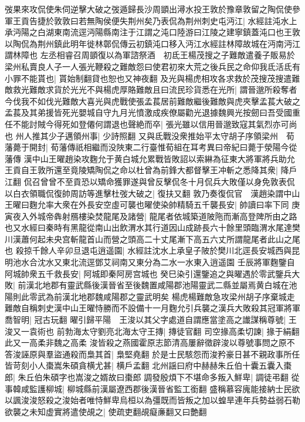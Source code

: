弢果來攻侃使朱伺逆擊大破之弢遁歸長沙周顗出潯水投王敦於豫章敦留之陶侃使參軍王貢告捷於敦敦曰若無陶侯便失荆州矣乃表侃為荆州刺史屯沔江|{
	水經註沌水上承沔陽之白湖東南流逕沔陽縣南注于江謂之沌口陸游曰江陵之建寧鎮蓋沌口也王敦以陶侃為荆州鎮此明年徙林鄣侃傳云初鎮沌口移入沔江水經註林障故城在沔南沔江謂林障也}
左丞相睿召周顗復以為軍諮祭酒　初氐王楊茂搜之子難敵遣養子販易於梁州私賣良人子一人張光鞭殺之難敵怨曰使君初來大荒之後兵民之命仰我氐活氐有小罪不能貰也|{
	貰始制翻貸也恕也又神夜翻}
及光與楊虎相攻各求救於茂搜茂搜遣難敵救光難敵求貨於光光不與楊虎厚賂難敵且曰流民珍貨悉在光所|{
	謂晉邈所殺奪者}
今伐我不如伐光難敵大喜光與虎戰使張孟萇居前難敵繼後難敵與虎夾擊孟萇大破之孟萇及其弟援皆死光嬰城自守九月光憤激成疾僚屬勸光退據魏興光按劒曰吾受國重任不能討賊今得死如登僊何謂退也聲絶而卒|{
	張光雖以信用晉邈致寇其氣烈亦可尚也}
州人推其少子邁領州事|{
	少詩照翻}
又與氐戰没衆推始平太守胡子序領梁州　荀藩薨于開封|{
	荀藩傳祇相繼而没陜東二行臺惟荀組在耳考異曰帝紀曰薨于滎陽今從藩傳}
漢中山王曜趙染攻麴允于黄白城允累戰皆敗詔以索綝為征東大將軍將兵助允　王貢自王敦所還至竟陵矯陶侃之命以杜曾為前鋒大都督擊王冲斬之悉降其衆|{
	降戶江翻}
侃召曾曾不至貢恐以矯命獲罪遂與曾反擊侃冬十月侃兵大敗僅以身免敦表侃以白衣領職侃復帥周訪等進擊杜弢大破之|{
	復扶又翻}
敦乃奏復侃官　漢趙染謂中山王曜曰麴允率大衆在外長安空虛可襲也曜使染帥精騎五千襲長安|{
	帥讀曰率下同}
庚寅夜入外城帝犇射鴈樓染焚龍尾及諸營|{
	龍尾者依城築道陂陁而漸高登陴所由之路也又水經曰秦時有黑龍從南山出飲渭水其行道因山成跡長六十餘里頭臨渭水尾達樊川漢蕭何起未央宫斬龍首山而營之頭高二十丈尾漸下高五六丈所謂龍尾者此山之尾也}
殺掠千餘人辛卯旦退屯逍遥園|{
	水經註沈水上承皇子陂於樊川北逕長安城西與昆明池水合沈水又東北流逕鄧艾祠南又東分為二水一水東入逍遥園}
壬辰將軍麴鑒自阿城帥衆五千救長安|{
	阿城即秦阿房宫城也}
癸巳染引還鑒追之與曜遇於零武鑒兵大敗|{
	前漢北地郡有靈武縣後漢晉省至後魏置咸陽郡池陽靈武二縣並屬焉黄白城在池陽則此零武為前漢北地郡魏咸陽郡之靈武明矣}
楊虎楊難敵急攻梁州胡子序棄城走難敵自稱刺史漢中山王曜恃勝而不設備十一月麴允引兵襲之漢兵大敗殺其冠軍將軍喬智明|{
	冠古玩翻}
曜引歸平陽　王浚以其父字處道自謂應當塗高之䜟謀稱尊號|{
	王浚又一袁術也}
前勃海太守劉亮北海太守王摶|{
	摶徒官翻}
司空掾高柔切諫|{
	掾于絹翻此又一高柔非魏之高柔}
浚皆殺之燕國霍原志節清高屢辭徵辟浚以尊號事問之原不答浚誣原與羣盜通殺而梟其首|{
	梟堅堯翻}
於是士民駭怨而浚矜豪日甚不親政事所任皆苛刻小人棗嵩朱碩貪横尤甚|{
	横戶孟翻}
北州謡曰府中赫赫朱丘伯十囊五囊入棗郎|{
	朱丘伯朱碩字也嵩浚之婿故曰棗郎}
調發殷煩下不堪命多叛入鮮卑|{
	調徒弔翻}
從事韓咸監護柳城|{
	柳城縣前漢屬遼西郡後漢晉省監工銜翻}
盛稱慕容廆能接納士民欲以諷浚浚怒殺之浚始者唯恃鮮卑烏桓以為彊既而皆叛之加以蝗旱連年兵勢益弱石勒欲襲之未知虚實將遣使覘之|{
	使疏吏翻覘癡亷翻又曰艶翻}
